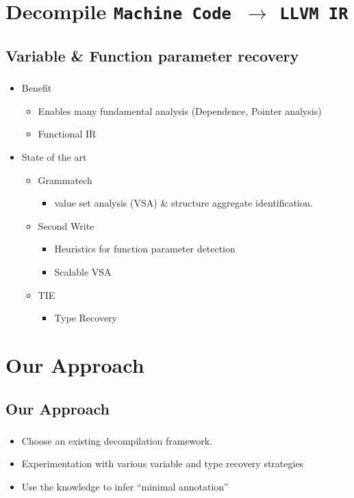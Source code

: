 \documentclass[mathserif,10pt]{beamer}
\newcommand{\LIR}{{\tt LLVM IR}}
\newcommand{\MC}{{\tt Machine Code}}
\begin{document}
\section{Decompile \MC \ $\rightarrow$ \LIR}
  \subsection{Variable \& Function parameter recovery}
  \frame
  {
    \frametitle{\subsecname}
    \begin{itemize}
      \item Benefit
        \begin{itemize}
          \item Enables many fundamental analysis (Dependence, Pointer analysis)
          \item Functional IR
        \end{itemize}
      \item State of the art
        \begin{itemize}
          \item Grammatech
            \begin{itemize}
              \item value set analysis (VSA) \& structure aggregate identification.
            \end{itemize}     
          \item Second Write 
            \begin{itemize}
              \item Heuristics for function parameter detection
              \item Scalable VSA
            \end{itemize}     
          \item TIE
            \begin{itemize}
              \item Type Recovery
            \end{itemize}     
        \end{itemize}
    \end{itemize}

  }

\section{Our Approach}
  \subsection*{Our Approach}
  \frame
  {
    \frametitle{\subsecname}
    \begin{itemize}
      \item Choose an existing decompilation framework.
      \item Experimentation with various variable and type recovery strategies
      \item Use the knowledge to infer ``minimal annotation''
    \end{itemize}

  }
\end{document}
